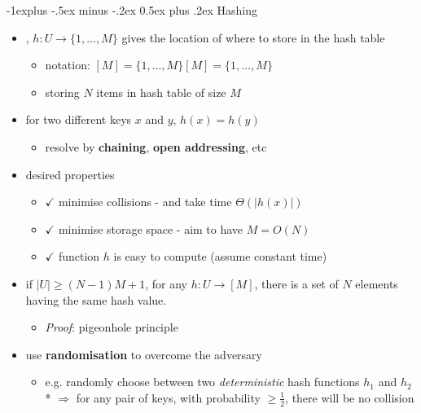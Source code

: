\documentclass[10pt, landscape]{article}
\makeatletter
\renewcommand{\subsection}{\@startsection{subsection}{2}{0mm}%
  {-1explus -.5ex minus -.2ex}%
  {0.5ex plus .2ex}%
{\normalfont\normalsize\bfseries}}
\makeatother
\begin{document}
\begin{multicols*}{4}
  \subsection{Hashing}

  \begin{itemize}
    \item {}, $h:U \to \{1, \dots, M\}$ gives the location of where to store in the hash table
      \begin{itemize}
        \item notation: $[M] = \{ 1, \dots, M \}[M] = \{ 1, \dots, M \}$
        \item storing $N$ items in hash table of size $M$
      \end{itemize}
    \item {} for two different keys $x$ and $y$, $h(x) = h(y)$ 
      \begin{itemize}
        \item resolve by \textbf{chaining}, \textbf{open addressing}, etc
      \end{itemize}
    \item desired properties 
      \begin{itemize}
        \item $\checkmark$ minimise collisions -  and  take time $\Theta(\vert h(x) \vert)$
        \item $\checkmark$ minimise storage space - aim to have $M = O(N)$
        \item $\checkmark$ function $h$ is easy to compute (assume constant time)
      \end{itemize}
    \item if $\vert U \vert \geq (N-1) M + 1$, for any $h:U \to [M]$, there is a set of $N$ elements having the same hash value.
      \begin{itemize}
        \item \textit{Proof}: pigeonhole principle
      \end{itemize}
    \item use \textbf{randomisation} to overcome the adversary
      \begin{itemize}
        \item e.g. randomly choose between two \textit{deterministic} hash functions $h_1$ and $h_2$ 
          \\* $\Rightarrow$ for any pair of keys, with probability $\geq \frac{1}{2} $, there will be no collision
      \end{itemize}
  \end{itemize}


\end{multicols*}
\end{document}
